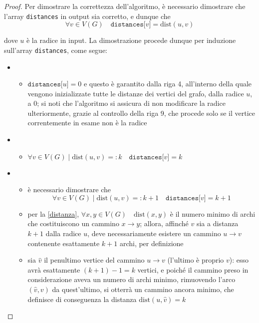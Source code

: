 \documentclass[a4paper, 12pt]{report}
\begin{document}
    \begin{proof}
        Per dimostrare la correttezza dell'algoritmo, è necessario dimostrare che l'array \texttt{distances} in output sia corretto, e dunque che $$\forall v \in V(G) \quad \texttt{distances[}v\texttt{]} = \mathrm{dist}(u, v)$$

        dove $u$ è la radice in input. La dimostrazione procede dunque per induzione sull'array \texttt{distances}, come segue:

        \begin{itemize}
            \item {}
                \begin{itemize}
                    \item $\texttt{distances[}u\texttt{]} = 0$ e questo è garantito dalla riga 4, all'interno della quale vengono inizializzate tutte le distanze dei vertici del grafo, dalla radice $u$, a 0; si noti che l'algoritmo si assicura di non modificare la radice ulteriormente, grazie al controllo della riga 9, che procede solo se il vertice correntemente in esame non è la radice
                \end{itemize}
            \item {}
                \begin{itemize}
                    \item $\forall v \in V(G) \mid \mathrm{dist}(u, v) =: k \quad \texttt{distances[}v\texttt{]} = k$
                \end{itemize}
            \item {}
                \begin{itemize}
                    \item è necessario dimostrare che $$\forall v \in V(G) \mid \mathrm{dist}(u, v) =: k + 1 \quad \texttt{distances[}v\texttt{]} = k + 1$$
                    \item per la \cref{distanza}, $\forall x, y \in V(G) \quad \mathrm{dist}(x, y)$ è il numero minimo di archi che costituiscono un cammino $x \rightarrow y$; allora, affinché $v$ sia a distanza $k + 1$ dalla radice $u$, deve necessariamente esistere un cammino $u \rightarrow v$ contenente esattamente $k + 1$ archi, per definizione
                    \item sia $\hat v$ il penultimo vertice del cammino $u \rightarrow v$ (l'ultimo è proprio $v$): esso avrà esattamente $(k + 1) - 1 = k$ vertici, e poiché il cammino preso in considerazione aveva un numero di archi minimo, rimuovendo l'arco $(\hat v, v)$ da quest'ultimo, si otterrà un cammino ancora minimo, che definisce di conseguenza la distanza $\mathrm{dist}(u, \hat v) = k$

\end{itemize}
\end{itemize}
\end{proof}
\end{document}

